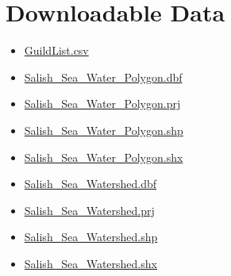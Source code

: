 \documentclass[
  letterpaper,
  DIV=11,
  numbers=noendperiod]{scrreprt}
\providecommand{\tightlist}{%
  \setlength{\itemsep}{0pt}\setlength{\parskip}{0pt}}\usepackage{longtable,booktabs,array}
\begin{document}
\section{Downloadable Data}\label{9.92BirdsCan}

\begin{itemize}
\tightlist
\item
  \href{Data/GuildList.csv}{GuildList.csv}
\item
  \href{Data/Spatial/Salish_Sea_Water_Polygon.dbf}{Salish\_Sea\_Water\_Polygon.dbf}
\item
  \href{Data/Spatial/Salish_Sea_Water_Polygon.prj}{Salish\_Sea\_Water\_Polygon.prj}
\item
  \href{Data/Spatial/Salish_Sea_Water_Polygon.shp}{Salish\_Sea\_Water\_Polygon.shp}
\item
  \href{Data/Spatial/Salish_Sea_Water_Polygon.shx}{Salish\_Sea\_Water\_Polygon.shx}
\item
  \href{Data/Spatial/Salish_Sea_Watershed.dbf}{Salish\_Sea\_Watershed.dbf}
\item
  \href{Data/Spatial/Salish_Sea_Watershed.prj}{Salish\_Sea\_Watershed.prj}
\item
  \href{Data/Spatial/Salish_Sea_Watershed.shp}{Salish\_Sea\_Watershed.shp}
\item
  \href{Data/Spatial/Salish_Sea_Watershed.shx}{Salish\_Sea\_Watershed.shx}
\end{itemize}
\end{document}
